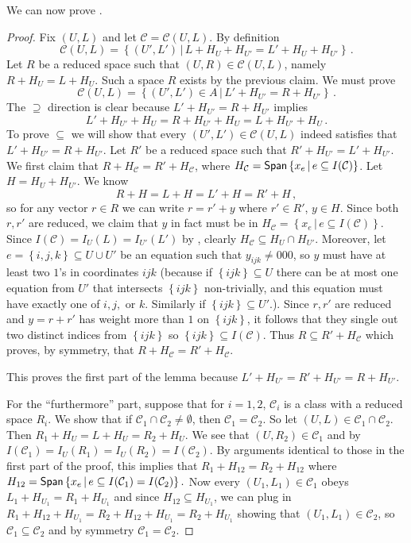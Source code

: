 \documentclass{toc}
\newcommand\set[1]{{\left\{ #1 \right\}}}
\newcommand\Set[2]{ \left\{ #1 \,  \vert  \, #2\right\} }
\newcommand\spn{{\sf Span}}
\renewcommand\subset{\subseteq}
\def\C{\mathcal{C}}
\begin{document}
We can now prove .
\begin{proof}
Fix $(U,L)$ and let $\C=\C(U,L)$. By definition
\[
\C(U,L) = \Set{(U',L') }{ L+H_U+H_{U'} =
  L' + H_U + H_{U'}}\,.
\]
Let $R$ be a reduced space such that $(U,R)\in
\C(U,L)$, namely  $R+H_{U} = L+H_{U}$. Such a space $R$ exists by the previous claim. We must prove
\[ \C(U,L) = \Set{ (U',L')\in A }{ L'+H_{U'}= R+H_{U'}}\,.
\]
The $\supseteq$ direction is clear because $L'+H_{U'}= R+H_{U'}$ implies
\[ L' + H_{U'} + H_U = R + H_{U'} + H_U = L + H_{U'} + H_U\,.\]
%
To prove $\subseteq$ we will show that every $(U',L')\in \C(U,L)$ indeed satisfies that $L' + H_{U'} = R + H_{U'}$. Let $R'$ be a reduced space such that $R'+H_{U'} = L'+H_{U'}$. We first claim that $R+H_\C=R'+H_\C $, where $H_\C =
\spn\Set{x_e}{e\subset I(\C)}$. Let $H = H_{U}+ H_{U'}$. We know
%
\[R + H = L + H = L' + H= R' + H\,, \]
%
so for any vector $r\in R$ we can write $r = r' + y$ where $r'\in R'$, $y\in H$. Since both $r,r'$ are reduced, we claim that $y$ in fact must be in $H_\C = \Set{x_e}{e\subset I(\C)}$. Since $I(\C)=I_U(L)=I_{U'}(L')$ by , clearly $H_\C\subset H_{U}\cap H_{U'}$. Moreover, let $e=\set{i,j,k}\subset U\cup U'$ be an equation such that $y_{ijk}\neq 000$, so $y$ must have at least two $1$'s in coordinates $ijk$ (because if $\set {ijk} \subset U$ there can be at most one equation from $U'$ that intersects $\set{ijk}$ non-trivially, and this equation must have exactly one of $i,j,$ or $k$. Similarly if $\set {ijk}\subset U'$.). Since $r,r'$ are reduced and $y = r+r'$ has weight more than $1$ on $\set{ijk}$, it follows that they single out two distinct indices from $\set{ijk}$ so $\set{ijk}\subset I(\C)$. Thus $R\subset R'+H_\C$ which proves, by symmetry, that $R+H_\C = R'+H_\C$.

This proves the first part of the lemma because $L' + H_{U'} = R' + H_{U'} = R + H_{U'}$.

For the ``furthermore'' part, suppose that for $i=1,2$, $\C_i$ is a class with a reduced space $R_i$. We show that if $\C_1\cap\C_2 \neq \emptyset$, then $\C_1=\C_2$. So let $(U,L) \in \C_1\cap \C_2$. Then
$R_1+H_U = L+H_U = R_2 + H_U$.
%
We see that $(U,R_2)\in \C_1$ and by  $I(\C_1)=I_U(R_1)=I_U(R_2)= I(\C_2)$.
%
By arguments identical to those in the first part of the proof, this implies that $R_1+H_{12} = R_2+H_{12}$ where
$H_{12} = \spn\Set{x_e}{e\subset I(\C_1)=I(\C_2)}.$
Now every $(U_1,L_1)\in \C_1$ obeys $L_1+H_{U_1} = R_1+H_{U_1}$ and since $H_{12} \subset H_{U_1}$, we can plug in $R_1 + H_{12} + H_{U_1} = R_2 + H_{12} + H_{U_1} = R_2 + H_{U_1}$ showing that $(U_1,L_1)\in \C_2$, so $\C_1\subseteq\C_2$ and by symmetry $\C_1=\C_2$.
%
\end{proof}
\end{document}
